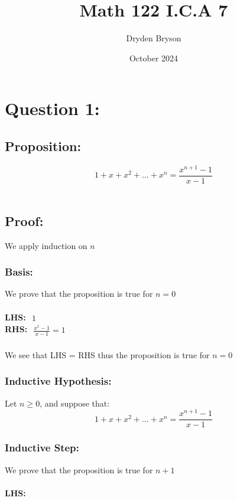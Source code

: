 \documentclass{article}
\title{Math 122 I.C.A 7}
\author{Dryden Bryson}
\date{October 2024}
\begin{document}
\maketitle

\newpage
\section*{Question 1:}
\subsection*{\textbf{Proposition:}} $$1+x+x^2+\dots+x^n = \frac{x^{n+1}-1}{x-1}$$
 \\
\subsection*{\textbf{Proof:}}
We apply induction on $n$
\subsubsection*{\textbf{Basis:}}
We prove that the proposition is true for $n = 0$
\\\\\textbf{LHS:}
$\begin{aligned}
    1
\end{aligned}$
\\\textbf{RHS:}
$
\begin{aligned}
    \frac{x^1-1}{x-1}
    =1
\end{aligned}
$
 \\\\
We see that LHS = RHS thus the proposition is true for $n=0$
\subsubsection*{\textbf{Inductive Hypothesis:}}
Let $n\geq 0$, and suppose that:$$1+x+x^2+\dots+x^n = \frac{x^{n+1}-1}{x-1}$$

\subsubsection*{\textbf{Inductive Step:}}
We prove that the proposition is true for $n+1$\\\\
\textbf{LHS:}
\end{document}
